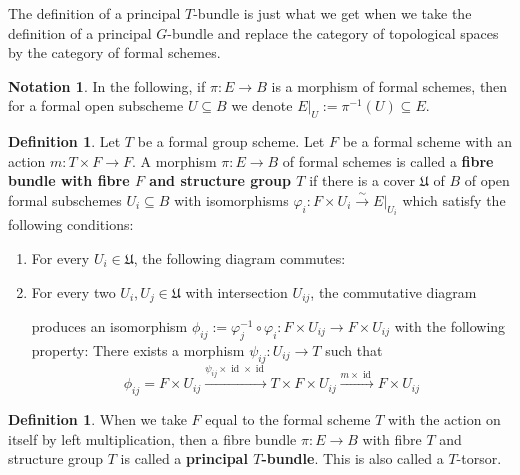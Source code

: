 \documentclass[10pt,oneside]{amsart}
\theoremstyle{definition}
\newtheorem{definition}[theorem]{Definition}
\newtheorem{notation}[theorem]{Notation}
\begin{document}
	
	The definition of a principal $T$-bundle is just what we get when we take the definition of a principal $G$-bundle and replace the category of topological spaces by the category of formal schemes.
	\begin{notation}
		In the following, if $\pi:E\rightarrow B$ is a morphism of formal schemes, then for a formal open subscheme $U\subseteq B$ we denote $E|_U:=\pi^{-1}(U)\subseteq E$.
	\end{notation}
	\begin{definition}\label{definition principal T-bundle}
		Let $T$ be a formal group scheme. Let $F$ be a formal scheme with an action $m:T\times F\rightarrow F$.
		A morphism $\pi:E\rightarrow B$ of formal schemes is called a \textbf{fibre bundle with fibre $F$ and structure group $T$} if there is a cover $\mathfrak U$ of $B$ of open formal subschemes $U_i\subseteq B$ with isomorphisms $\varphi_i:F\times U_i \xrightarrow{\sim} E|_{U_i}$ which satisfy the following conditions:
		\begin{enumerate}[label=(\alph*)]
			\item For every $U_i\in \mathfrak U$, the following diagram commutes:
			\begin{center}
			\end{center}
			\item For every two $U_i,U_j\in \mathfrak U$ with intersection $U_{ij}$, the commutative diagram
			\begin{center}
			\end{center}
			produces an isomorphism $\phi_{ij}:=\varphi_j^{-1}\circ\varphi_i: F\times U_{ij}\rightarrow F\times U_{ij}$ with the following property: There exists a morphism $\psi_{ij}:U_{ij}\rightarrow T$ such that
			\[\phi_{ij}=F\times U_{ij} \xrightarrow{\psi_{ij}\times \operatorname{id}\times\operatorname{id}} T\times F\times U_{ij}\xrightarrow{m\times \operatorname{id}} F\times U_{ij}\]
		\end{enumerate}
	\end{definition}
	\begin{definition}
		When we take $F$ equal to the formal scheme $T$ with the action on itself by left multiplication, then a fibre bundle $\pi:E\rightarrow B$ with fibre $T$ and structure group $T$ is called a \textbf{principal $T$-bundle}. This is also called a $T$-torsor.
	\end{definition}
	
\end{document}
